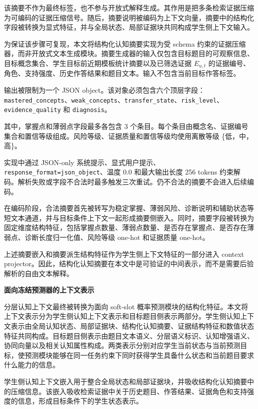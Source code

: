 \documentclass[UTF8,a4paper,12pt]{ctexart}
\numberwithin{table}{section}
\begin{document}
该摘要不作为最终标签，也不参与开放式解释生成。其作用是把多条检索证据压缩为可编码的证据压缩信号。随后，摘要说明被编码为上下文向量，摘要中的结构化字段被转换为显式特征，并与全局状态、局部证据块共同构成学生侧上下文输入。

为保证该步骤可复现，本文将结构化认知摘要实现为受 schema 约束的证据压缩器，而非开放式文本生成模块。摘要生成器的输入仅包含目标题目的可观察信息、目标概念集合、学生目标前近期模板统计摘要以及已筛选证据 \(E_{u,t}\) 的证据编号、角色、支持强度、历史作答结果和题目文本。输入不包含当前目标作答标签。

输出被限制为一个 JSON object。该对象必须包含六个顶层字段：\texttt{mastered\_concepts}、\texttt{weak\_concepts}、\texttt{transfer\_state}、\texttt{risk\_level}、\texttt{evidence\_quality} 和 \texttt{diagnosis}。

其中，掌握点和薄弱点字段最多各包含 3 个条目。每个条目由概念名、证据编号集合和置信等级组成。风险等级、证据质量和置信等级均使用离散等级 \{低，中，高\}。

实现中通过 JSON-only 系统提示、显式用户提示、\texttt{response\_format=json\_object}、温度 0.0 和最大输出长度 256 tokens 约束解码。解析失败或字段不合法时最多触发三次重试。仍不合法的摘要不会进入后续编码。

在编码阶段，合法摘要首先被转写为稳定掌握、薄弱风险、诊断说明和辅助状态等短文本通道，并与目标条件上下文一起形成摘要侧嵌入。同时，摘要字段被转换为固定维度结构特征，包括掌握点数量、薄弱点数量、是否存在掌握点、是否存在薄弱点、诊断长度归一化值、风险等级 one-hot 和证据质量 one-hot。

上述摘要嵌入和摘要派生结构特征作为学生侧上下文特征的一部分进入 context projector。因此，结构化认知摘要在本文中是可验证的中间表示，而不是需要后验解析的自由文本解释。

\noindent\textbf{面向冻结预测器的上下文表示}

分层认知上下文最终被转换为面向 soft-slot 概率预测模块的结构化特征。本文将上下文表示分为学生侧认知上下文表示和目标题目侧表示两部分。学生侧认知上下文表示由全局认知状态、局部证据块、结构化认知摘要、证据结构特征和数值状态特征共同构成。目标题目侧表示由题目文本语义、分层语义标识、认知增强语义、协同向量以及相关认知属性构成。两类表示分别对应学生当前状态与当前预测目标，使预测模块能够在同一任务约束下同时获得学生具备什么状态和当前题目要求什么能力的信息。

学生侧认知上下文嵌入用于整合全局状态和局部证据块，并吸收结构化认知摘要中的压缩信息。该嵌入吸收检索证据中关于历史题目、作答结果、证据角色和支持强度的信息，形成目标条件下的学生状态表示。
\end{document}
